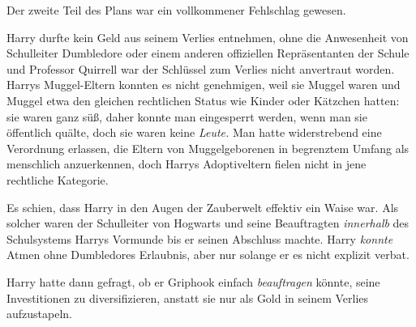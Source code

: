 Der zweite Teil des Plans war ein vollkommener Fehlschlag gewesen.

Harry durfte kein Geld aus seinem Verlies entnehmen, ohne die Anwesenheit von Schulleiter Dumbledore oder einem anderen offiziellen Repräsentanten der Schule und Professor Quirrell war der Schlüssel zum Verlies nicht anvertraut worden. Harrys Muggel-Eltern konnten es nicht genehmigen, weil sie Muggel waren und Muggel etwa den gleichen rechtlichen Status wie Kinder oder Kätzchen hatten: sie waren ganz süß, daher konnte man eingesperrt werden, wenn man sie öffentlich quälte, doch sie waren keine \emph{Leute.} Man hatte widerstrebend eine Verordnung erlassen, die Eltern von Muggelgeborenen in begrenztem Umfang als menschlich anzuerkennen, doch Harrys Adoptiveltern fielen nicht in jene rechtliche Kategorie.

Es schien, dass Harry in den Augen der Zauberwelt effektiv ein Waise war. Als solcher waren der Schulleiter von Hogwarts und seine Beauftragten \emph{innerhalb} des Schulsystems Harrys Vormunde bis er seinen Abschluss machte. Harry \emph{konnte} Atmen ohne Dumbledores Erlaubnis, aber nur solange er es nicht explizit verbat.

Harry hatte dann gefragt, ob er Griphook einfach \emph{beauftragen} könnte, seine Investitionen zu diversifizieren, anstatt sie nur als Gold in seinem Verlies aufzustapeln.

